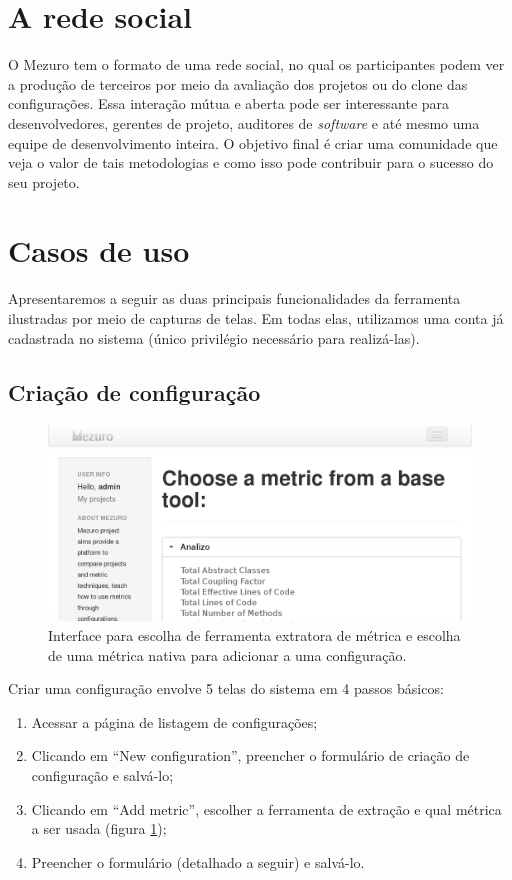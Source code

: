 \documentclass{llncs}
\begin{document}
\section{A rede social}\label{sec:user-potencial}
O Mezuro tem o formato de uma rede social, no qual os participantes podem ver a produção de terceiros por meio da avaliação dos projetos ou do clone das configurações. Essa interação mútua e aberta pode ser interessante para desenvolvedores, gerentes de projeto, auditores de \textit{software} e até mesmo uma equipe de desenvolvimento inteira. O objetivo final é criar uma comunidade que veja o valor de tais metodologias e como isso pode contribuir para o sucesso do seu projeto.

\section{Casos de uso}
Apresentaremos a seguir as duas principais funcionalidades da ferramenta ilustradas por meio de capturas de telas. Em todas elas, utilizamos uma conta já cadastrada no sistema (único privilégio necessário para realizá-las).

  \subsection{Criação de configuração}
  \begin{figure}[H]
    \centering
    \includegraphics[width=\textwidth]{images/choose-metric.png}
    \caption{Interface para escolha de ferramenta extratora de métrica e escolha de uma métrica nativa para adicionar a uma configuração.}
    \label{fig:choose-metric}
  \end{figure}

  Criar uma configuração envolve 5 telas do sistema em 4 passos básicos:
  \begin{enumerate}
    \item Acessar a página de listagem de configurações;
    \item Clicando em ``New configuration'', preencher o formulário de criação de configuração e salvá-lo;
    \item Clicando em ``Add metric'', escolher a ferramenta de extração e qual métrica a ser usada (figura \ref{fig:choose-metric});
    \item Preencher o formulário (detalhado a seguir) e salvá-lo.
  \end{enumerate}
\end{document}
